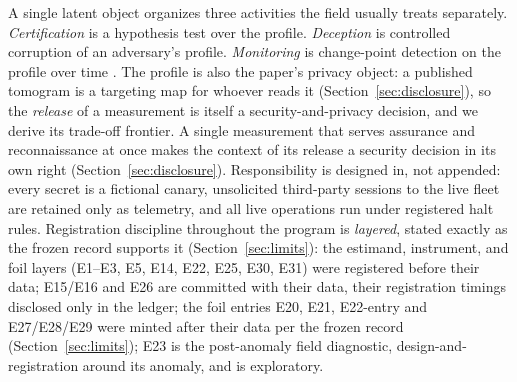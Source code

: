 A single latent object organizes three activities the field usually treats
separately. \emph{Certification} is a hypothesis test over the profile.
\emph{Deception} is controlled corruption of an adversary's profile.
\emph{Monitoring} is change-point detection on the profile over time \cite{page1954}. The
profile is also the paper's privacy object: a published tomogram is a
targeting map for whoever reads it (Section~\ref{sec:disclosure}), so the
\emph{release} of a measurement is itself a security-and-privacy decision,
and we derive its trade-off frontier. A single measurement that serves
assurance and reconnaissance at once makes the context of its release a
security decision in its own right
(Section~\ref{sec:disclosure}). Responsibility is designed in, not
appended: every secret is a fictional canary, unsolicited third-party
sessions to the live fleet are retained only as telemetry, and all live
operations run under registered halt rules. Registration discipline
throughout the program is \emph{layered}, stated exactly as the frozen
record supports it (Section~\ref{sec:limits}): the estimand, instrument,
and foil layers (E1--E3, E5, E14, E22, E25, E30, E31) were registered
before their data; E15/E16 and E26 are committed with their data, their
registration timings disclosed only in the ledger; the foil entries E20,
E21, E22-entry and E27/E28/E29 were minted after their data per the frozen
record (Section~\ref{sec:limits}); E23 is the post-anomaly field diagnostic,
design-and-registration around its anomaly, and is exploratory.

